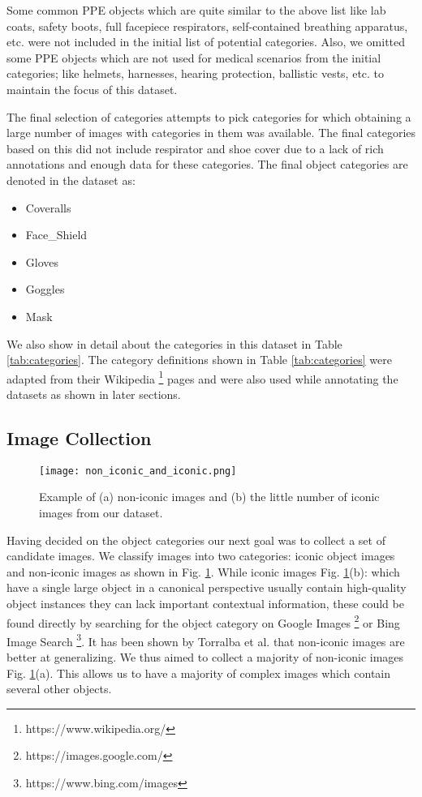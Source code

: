 \documentclass{article}
\begin{document}
Some common PPE objects which are quite similar to the above list like lab coats, safety boots, full facepiece respirators, self-contained breathing apparatus, etc. were not included in the initial list of potential categories. Also, we omitted some PPE objects which are not used for medical scenarios from the initial categories; like helmets, harnesses, hearing protection, ballistic vests, etc. to maintain the focus of this dataset.

The final selection of categories attempts to pick categories for which obtaining a large number of images with categories in them was available. The final categories based on this did not include respirator and shoe cover due to a lack of rich annotations and enough data for these categories. The final object categories are denoted in the dataset as:

\begin{itemize}
    \item Coveralls
    \item Face\_Shield
    \item Gloves
    \item Goggles
    \item Mask
\end{itemize}

We also show in detail about the categories in this dataset in Table \ref{tab:categories}. The category definitions shown in Table \ref{tab:categories} were adapted from their Wikipedia \footnote{https://www.wikipedia.org/} pages and were also used while annotating the datasets as shown in later sections.

\subsection{Image Collection}
\label{Image Collection}

\begin{figure}
    \centering
    \texttt{[image: non\_iconic\_and\_iconic.png]}
    \caption{Example of (a) non-iconic images and (b) the little number of iconic images from our dataset.}
  \label{fig:iconic-and-non-iconic}
\end{figure}

Having decided on the object categories our next goal was to collect a set of candidate images. We classify images into two categories: iconic object images and non-iconic images as shown in Fig. \ref{fig:iconic-and-non-iconic}. While iconic images Fig. \ref{fig:iconic-and-non-iconic}(b): which have a single large object in a canonical perspective usually contain high-quality object instances they can lack important contextual information, these could be found directly by searching for the object category on Google Images \footnote{https://images.google.com/} or Bing Image Search \footnote{https://www.bing.com/images}. It has been shown by Torralba et al. \cite{5995347} that non-iconic images are better at generalizing. We thus aimed to collect a majority of non-iconic images Fig. \ref{fig:iconic-and-non-iconic}(a). This allows us to have a majority of complex images which contain several other objects.
\end{document}
